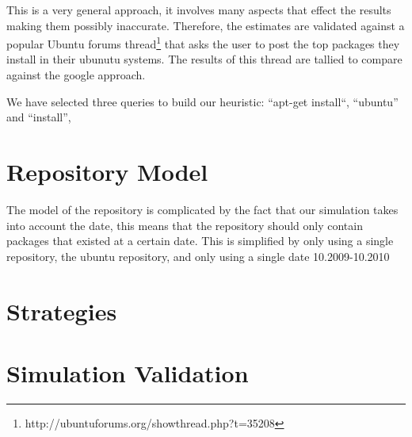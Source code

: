 This is a very general approach, it involves many aspects that effect the results making them possibly inaccurate.
Therefore, the estimates are validated against a popular Ubuntu forums thread\footnote{http://ubuntuforums.org/showthread.php?t=35208} 
that asks the user to post the top packages they install in their ubunutu systems. 
The results of this thread are tallied to compare against the google approach.

We have selected three queries to build our heuristic:
``apt-get install``, ``ubuntu'' and ``install'', 


\section{Repository Model}
{}The model of the repository is complicated by the fact that our simulation takes into account the date, this means that the repository should only contain packages that existed at a certain date.
{}This is simplified by only using a single repository, the ubuntu repository, and only using a single date 10.2009-10.2010






\section{Strategies}

\section{Simulation Validation}


